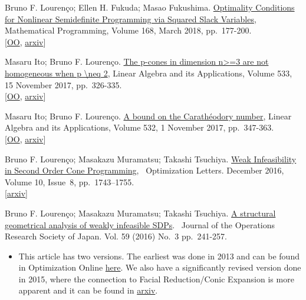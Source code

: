 Bruno F. Lourenço; Ellen H. Fukuda; Masao Fukushima.
\href{http://link.springer.com/article/10.1007/s10107-016-1040-4}{Optimality
Conditions for Nonlinear Semidefinite Programming via Squared Slack
Variables}, Mathematical Programming, Volume 168, March 2018,
pp.~177-200.\\
{[}\href{http://www.optimization-online.org/DB_HTML/2015/12/5250.html}{OO},
\href{https://arxiv.org/abs/1512.05507}{arxiv}{]}

Masaru Ito; Bruno F. Lourenço.
\href{http://www.sciencedirect.com/science/article/pii/S0024379517304494}{The
p-cones in dimension n\textgreater{}=3 are not homogeneous when p
\textbackslash{}neq 2}, Linear Algebra and its Applications, Volume 533,
15 November 2017, pp.~326-335.\\
{[}\href{http://www.optimization-online.org/DB_HTML/2016/12/5784.html}{OO},
\href{https://arxiv.org/abs/1701.05801}{arxiv}{]}

Masaru Ito; Bruno F. Lourenço.
\href{http://www.sciencedirect.com/science/article/pii/S002437951730407X}{A
bound on the Carathéodory number}, Linear Algebra and its Applications,
Volume 532, 1 November 2017, pp.~347-363.\\
{[}\href{http://www.optimization-online.org/DB_HTML/2016/07/5525.html}{OO},
\href{https://arxiv.org/abs/1608.07170}{arxiv}{]}

Bruno F. Lourenço; Masakazu Muramatsu; Takashi Tsuchiya.
\href{http://link.springer.com/article/10.1007/s11590-015-0982-4}{Weak
Infeasibility in Second Order Cone Programming},~ Optimization Letters.
December 2016, Volume 10, Issue~8, pp.~1743--1755.\\
{[}\href{http://arxiv.org/abs/1509.05168}{arxiv}{]}

Bruno F. Lourenço; Masakazu Muramatsu; Takashi Tsuchiya.
\href{http://www.orsj.or.jp/~archive/pdf/e_mag/Vol.59_03_241.pdf}{A
structural geometrical analysis of weakly infeasible SDPs}.~ Journal of
the Operations Research Society of Japan. Vol. 59 (2016) No.~3
pp.~241-257.

\begin{itemize}
\tightlist
\item
  This article has two versions. The earliest was done in 2013 and can
  be found in Optimization Online
  \href{http://www.optimization-online.org/DB_HTML/2013/11/4137.html}{here}.
  We also have a significantly revised version done in 2015, where the
  connection to Facial Reduction/Conic Expansion is more apparent and it
  can be found in \href{http://arxiv.org/abs/1507.06843}{arxiv}.
\end{itemize}

